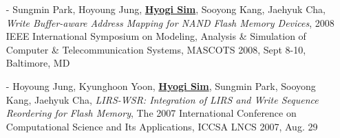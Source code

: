 \begin{itemize}[leftmargin=*]
 {\it Using Non-Volatile RAM as a Write Buffer for NAND Flash Memory-based
 Storage Devices},
 2008 IEEE International Symposium on Modeling, Analysis \& Simulation of
 Computer \& Telecommunication Systems, MASCOTS 2008, Sept 8-10, Baltimore, MD
\item[-] Sungmin Park, Hoyoung Jung, \underline{\bf Hyogi Sim}, Sooyong Kang, Jaehyuk Cha,
 {\it Write Buffer-aware Address Mapping for NAND Flash Memory Devices},
 2008 IEEE International Symposium on Modeling, Analysis \& Simulation of
 Computer \& Telecommunication Systems, MASCOTS 2008, Sept 8-10, Baltimore, MD
\item[-] Hoyoung Jung, Kyunghoon Yoon, \underline{\bf Hyogi Sim},
 Sungmin Park, Sooyong Kang, Jaehyuk Cha,
 {\it LIRS-WSR: Integration of LIRS and Write Sequence Reordering for Flash
 Memory},
 The 2007 International Conference on Computational Science and Its
 Applications, ICCSA LNCS 2007, Aug. 29
\end{itemize}

